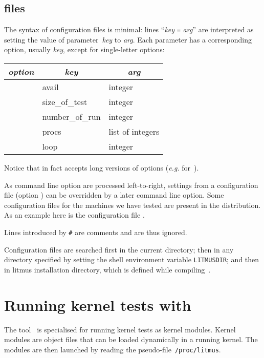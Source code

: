 \subsection*{ files}
The syntax of configuration files is minimal:
lines ``\textit{key} \texttt{=} \textit{arg}'' are interpreted
as setting the value of parameter~\textit{key} to \textit{arg}.
Each parameter has a corresponding option,
usually \opt{-}\textit{key}, except for single-letter options:
\begin{center}
\newenvironment{opts}
{\begin{tabular}{lll}
\hline \hline
\multicolumn{1}{c}{\quad\textit{option}\quad} &
\multicolumn{1}{c}{\quad\textit{key}\quad} &
\multicolumn{1}{c}{\quad\textit{arg}\quad} \\
\hline \hline}
{\hline \hline \end{tabular}}
\begin{opts}
\opt{-a} & avail & integer \\
\opt{-s} & size\_of\_test & integer\\
\opt{-r} & number\_of\_run & integer\\
\opt{-p} & procs & list of integers\\
\opt{-l} & loop & integer\\
\end{opts}
\end{center}
Notice that \litmus{} in fact accepts long versions of options
(\emph{e.g.}  for~).

As command line option are processed left-to-right,
settings from a configuration file (option )
can be overridden by a later
command line option.
Some configuration files for the machines we have tested
are present in the distribution. As an example here is the configuration
file .

Lines introduced by \verb+#+ are comments and are thus ignored.

Configuration files are searched first in the current directory;
then in any directory specified
by setting the shell environment variable \texttt{LITMUSDIR};
and then in litmus installation directory, which is defined
while compiling~\litmus{}.

\section{\label{klitmus}Running kernel tests with \klitmus}

The tool~\klitmus{} is specialised for running kernel tests as kernel modules.
Kernel modules are object files that can be loaded dynamically in a
running kernel. The modules are then launched by reading the
pseudo-file~\texttt{/proc/litmus}.


